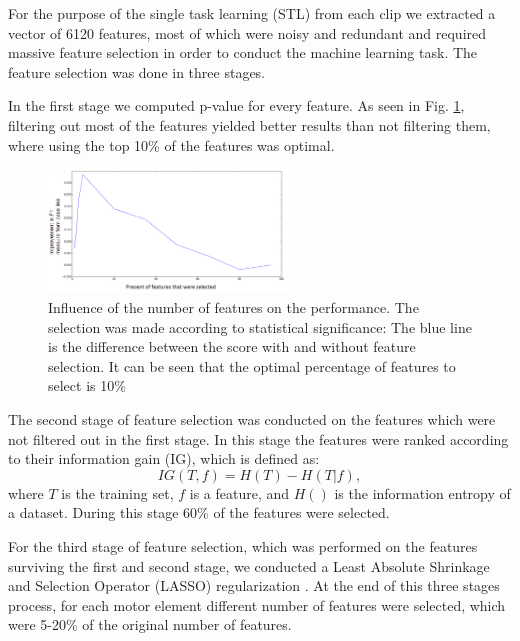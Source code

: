 For the purpose of the single task learning (STL) from each clip we extracted a
vector of 6120 features, most of which were noisy and redundant and required
massive feature selection in order to conduct the machine learning task. The
feature selection was done in three stages. 
\par In the first stage we computed
p-value for every feature. As seen in Fig. \ref{selection}, filtering out most
of the features yielded better results than not filtering them, where using the
top 10\% of the features was optimal.
\begin{figure}[ht!]
\centering
\includegraphics[width=2.5in]{graphics/Laban/featureSelection.png}
\caption{ Influence of the number of features on the performance. The
selection was made according to statistical significance: The blue line is the
difference between the score with and without feature selection. It can be seen
that the optimal percentage of features to select is 10\%}
\label{selection}
\end{figure}
\par The second stage of feature selection was conducted on the features which
were not filtered out in the first stage. In this stage the features were ranked
according to their information gain (IG), which is defined as:
\begin{equation}
       IG(T,f) = H(T) - H(T|f),
\end{equation}
where $T$ is the training set, $f$ is a feature, and $H()$ is the information
entropy of a dataset. During this stage 60\% of the features were selected. 
\par For the third stage of feature selection, which was performed on the
features surviving the first and second stage, we conducted a Least Absolute Shrinkage
and Selection Operator (LASSO) regularization \cite{lasso}. At the end of this
three stages process, for each motor element different number of features were
selected, which were 5-20\% of the original number of features.

